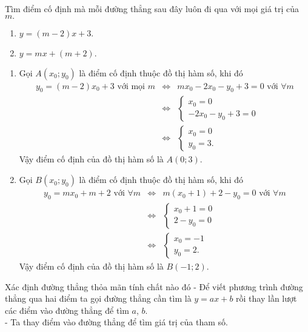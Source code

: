 \begin{vd}
	Tìm điểm cố định mà mỗi đường thẳng sau đây luôn đi qua với mọi giá trị của $m.$
	\begin{multicols}{2}
		\begin{enumerate}
			\item $y=(m-2)x+3.$
			\item $y=mx+(m+2).$
		\end{enumerate}
	\end{multicols}
	\loigiai
	{
		\begin{enumerate}
			\item Gọi $A(x_0;y_0)$ là điểm cố định thuộc đồ thị hàm số, khi đó
			\begin{eqnarray*}
				y_0=(m-2)x_0+3 \text{ với mọi } m &\Leftrightarrow & mx_0-2x_0-y_0+3=0 \text{ với } \forall m \\
				&\Leftrightarrow & \begin{cases}
					x_0=0\\
					-2x_0-y_0+3=0
				\end{cases}\\
				&\Leftrightarrow & \begin{cases}
					x_0=0\\
					y_0=3.
				\end{cases}
			\end{eqnarray*}
			Vậy điểm cố định của đồ thị hàm số là $A(0;3)$.
			\item Gọi $B(x_0;y_0)$ là điểm cố định thuộc đồ thị hàm số, khi đó
			\begin{eqnarray*}
				y_0=mx_0+m+2 \text{ với }\forall m &\Leftrightarrow & m(x_0+1)+2-y_0=0 \text{ với }\forall m \\
				&\Leftrightarrow & \begin{cases}
					x_0+1=0\\
					2-y_0=0
				\end{cases}\\
				&\Leftrightarrow & \begin{cases}
					x_0=-1\\
					y_0=2.
				\end{cases}
			\end{eqnarray*}
			Vậy điểm cố định của đồ thị hàm số là $B(-1;2)$.
		\end{enumerate}
	}
\end{vd}

\begin{dang}{Xác định đường thẳng thỏa mãn tính chất nào đó}
	- Để viết phương trình đường thẳng qua hai điểm ta gọi đường thẳng cần tìm là $y=ax+b$ rồi thay lần lượt các điểm vào đường thẳng để tìm $a$, $b$.\\
	- Ta thay điểm vào đường thẳng để tìm giá trị của tham số.
\end{dang}

